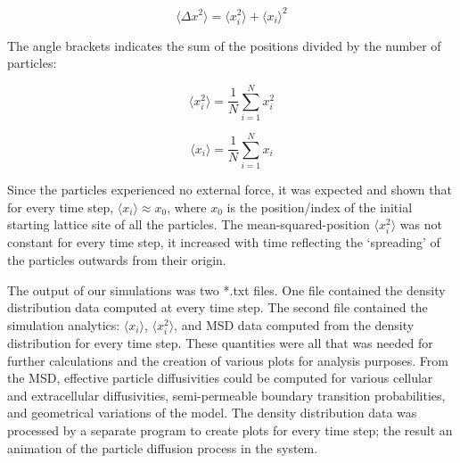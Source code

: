 	\begin{equation}
		\langle \Delta x^2 \rangle = \langle x_{i}^2 \rangle + \langle x_i \rangle^2
	\end{equation}
	
	The angle brackets indicates the sum of the positions divided by the number of particles:
	
	\begin{equation}
		\langle x_{i}^2 \rangle = \dfrac{1}{N}\sum_{i=1}^{N} x_{i}^2
	\end{equation}
	
	\begin{equation}
		\langle x_{i} \rangle = \dfrac{1}{N}\sum_{i=1}^{N} x_i
	\end{equation}
	
	Since the particles experienced no external force, it was expected and shown that for every time step, $ \langle x_{i} \rangle \approx x_0 $, where $ x_0 $ is the position/index of the initial starting lattice site of all the particles. The mean-squared-position $ \langle x_{i}^2 \rangle $ was not constant for every time step, it increased with time reflecting the `spreading' of the particles outwards from their origin.
	
%	
%	
%	
%	
	
	The output of our simulations was two *.txt files. One file contained the density distribution data computed at every time step. The second file contained the simulation analytics: $ \langle x_{i} \rangle $, $ \langle x_{i}^2 \rangle $, and MSD data computed from the density distribution for every time step. These quantities were all that was needed for further calculations and the creation of various plots for analysis purposes. From the MSD, effective particle diffusivities could be computed for various cellular and extracellular diffusivities, semi-permeable boundary transition probabilities, and geometrical variations of the model. The density distribution data was processed by a separate program to create plots for every time step; the result an animation of the particle diffusion process in the system.
	
